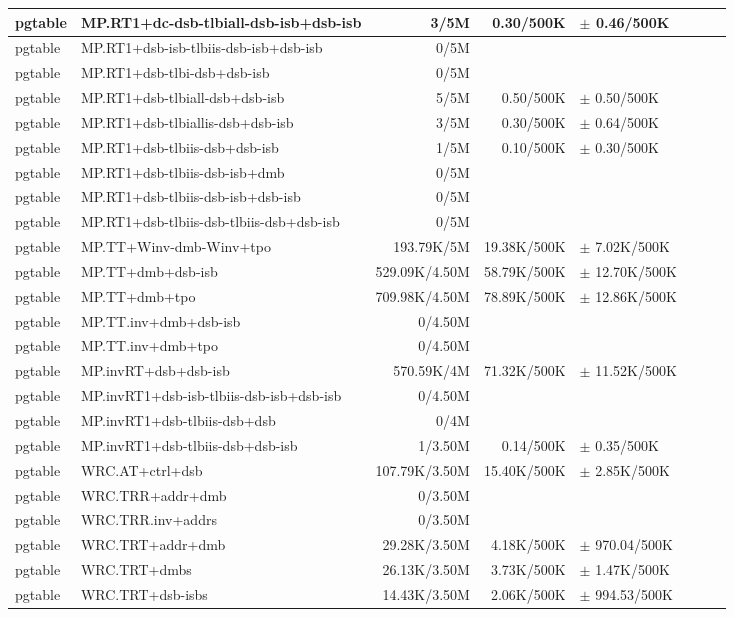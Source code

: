 \begin{tabular}{l l  | r r l | r r l}
   pgtable&MP.RT1+dc-dsb-tlbiall-dsb-isb+dsb-isb&3/5M&0.30/500K&$\pm$ 0.46/500K&\\
\hline
   pgtable&MP.RT1+dsb-isb-tlbiis-dsb-isb+dsb-isb&0/5M&&&\\
\hline
   pgtable&MP.RT1+dsb-tlbi-dsb+dsb-isb&0/5M&&&\\
\hline
   pgtable&MP.RT1+dsb-tlbiall-dsb+dsb-isb&5/5M&0.50/500K&$\pm$ 0.50/500K&\\
\hline
   pgtable&MP.RT1+dsb-tlbiallis-dsb+dsb-isb&3/5M&0.30/500K&$\pm$ 0.64/500K&\\
\hline
   pgtable&MP.RT1+dsb-tlbiis-dsb+dsb-isb&1/5M&0.10/500K&$\pm$ 0.30/500K&\\
\hline
   pgtable&MP.RT1+dsb-tlbiis-dsb-isb+dmb&0/5M&&&\\
\hline
   pgtable&MP.RT1+dsb-tlbiis-dsb-isb+dsb-isb&0/5M&&&\\
\hline
   pgtable&MP.RT1+dsb-tlbiis-dsb-tlbiis-dsb+dsb-isb&0/5M&&&\\
\hline
   pgtable&MP.TT+Winv-dmb-Winv+tpo&193.79K/5M&19.38K/500K&$\pm$ 7.02K/500K&\\
\hline
   pgtable&MP.TT+dmb+dsb-isb&529.09K/4.50M&58.79K/500K&$\pm$ 12.70K/500K&\\
\hline
   pgtable&MP.TT+dmb+tpo&709.98K/4.50M&78.89K/500K&$\pm$ 12.86K/500K&\\
\hline
   pgtable&MP.TT.inv+dmb+dsb-isb&0/4.50M&&&\\
\hline
   pgtable&MP.TT.inv+dmb+tpo&0/4.50M&&&\\
\hline
   pgtable&MP.invRT+dsb+dsb-isb&570.59K/4M&71.32K/500K&$\pm$ 11.52K/500K&\\
\hline
   pgtable&MP.invRT1+dsb-isb-tlbiis-dsb-isb+dsb-isb&0/4.50M&&&\\
\hline
   pgtable&MP.invRT1+dsb-tlbiis-dsb+dsb&0/4M&&&\\
\hline
   pgtable&MP.invRT1+dsb-tlbiis-dsb+dsb-isb&1/3.50M&0.14/500K&$\pm$ 0.35/500K&\\
\hline
   pgtable&WRC.AT+ctrl+dsb&107.79K/3.50M&15.40K/500K&$\pm$ 2.85K/500K&\\
\hline
   pgtable&WRC.TRR+addr+dmb&0/3.50M&&&\\
\hline
   pgtable&WRC.TRR.inv+addrs&0/3.50M&&&\\
\hline
   pgtable&WRC.TRT+addr+dmb&29.28K/3.50M&4.18K/500K&$\pm$ 970.04/500K&\\
\hline
   pgtable&WRC.TRT+dmbs&26.13K/3.50M&3.73K/500K&$\pm$ 1.47K/500K&\\
\hline
   pgtable&WRC.TRT+dsb-isbs&14.43K/3.50M&2.06K/500K&$\pm$ 994.53/500K&\\

\end{tabular}
